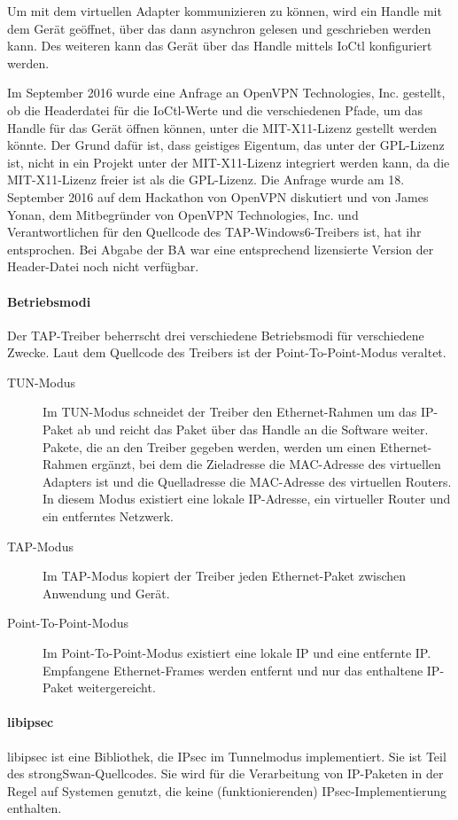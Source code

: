 Um mit dem virtuellen Adapter kommunizieren zu können, wird ein Handle mit dem Gerät
geöffnet, über das dann asynchron gelesen und geschrieben werden kann. Des weiteren kann
das Gerät über das Handle mittels IoCtl konfiguriert werden.

Im September 2016 wurde eine Anfrage an OpenVPN Technologies, Inc. gestellt, ob die Headerdatei für die IoCtl-Werte und die verschiedenen Pfade,
um das Handle für das Gerät öffnen können, unter die MIT-X11-Lizenz gestellt werden könnte.
Der Grund dafür ist, dass geistiges Eigentum, das unter der GPL-Lizenz ist, nicht in ein Projekt unter
der MIT-X11-Lizenz integriert werden kann, da die MIT-X11-Lizenz freier ist als die GPL-Lizenz.
Die Anfrage wurde am 18. September 2016 auf dem Hackathon von OpenVPN diskutiert
und von James Yonan, dem Mitbegründer von OpenVPN Technologies, Inc. und Verantwortlichen
für den Quellcode des TAP-Windows6-Treibers ist, hat ihr entsprochen.
Bei Abgabe der \ac{BA} war eine entsprechend lizensierte Version der Header-Datei noch nicht verfügbar.

\paragraph{Betriebsmodi}
Der TAP-Treiber beherrscht drei verschiedene Betriebsmodi für verschiedene Zwecke.
Laut dem Quellcode des Treibers ist der Point-To-Point-Modus veraltet.
\begin{description}
\item [TUN-Modus] Im TUN-Modus schneidet der Treiber den Ethernet-Rahmen um das 
IP-Paket ab und reicht das Paket über das Handle an die Software weiter. 
Pakete, die an den Treiber gegeben werden, werden um einen Ethernet-Rahmen
ergänzt, bei dem die Zieladresse die MAC-Adresse des virtuellen Adapters ist 
und die Quelladresse die MAC-Adresse des virtuellen Routers.
In diesem Modus existiert eine lokale IP-Adresse, ein virtueller Router und 
ein entferntes Netzwerk.
\item [TAP-Modus] Im TAP-Modus kopiert der Treiber jeden Ethernet-Paket zwischen 
Anwendung und Gerät.
\item [Point-To-Point-Modus] Im Point-To-Point-Modus existiert eine lokale IP 
und eine entfernte IP. Empfangene Ethernet-Frames werden entfernt und nur
das enthaltene IP-Paket weitergereicht.
\end{description}

\paragraph{libipsec}
libipsec ist eine Bibliothek, die IPsec im Tunnelmodus implementiert.
Sie ist Teil des strongSwan-Quellcodes. Sie wird für die Verarbeitung von IP-Paketen
in der Regel auf Systemen genutzt, die keine (funktionierenden) IPsec-Implementierung
enthalten.

